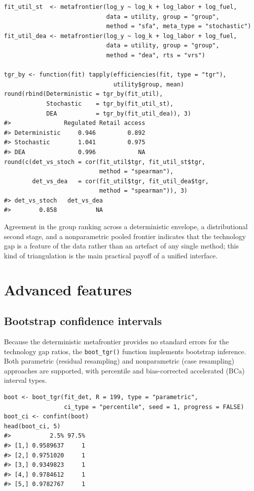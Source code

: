 \begin{verbatim}
fit_util_st  <- metafrontier(log_y ~ log_k + log_labor + log_fuel,
                             data = utility, group = "group",
                             method = "sfa", meta_type = "stochastic")
fit_util_dea <- metafrontier(log_y ~ log_k + log_labor + log_fuel,
                             data = utility, group = "group",
                             method = "dea", rts = "vrs")

tgr_by <- function(fit) tapply(efficiencies(fit, type = "tgr"),
                               utility$group, mean)
round(rbind(Deterministic = tgr_by(fit_util),
            Stochastic    = tgr_by(fit_util_st),
            DEA           = tgr_by(fit_util_dea)), 3)
#>               Regulated Retail access
#> Deterministic     0.946         0.892
#> Stochastic        1.041         0.975
#> DEA               0.996            NA
round(c(det_vs_stoch = cor(fit_util$tgr, fit_util_st$tgr,
                           method = "spearman"),
        det_vs_dea   = cor(fit_util$tgr, fit_util_dea$tgr,
                           method = "spearman")), 3)
#> det_vs_stoch   det_vs_dea 
#>        0.858           NA
\end{verbatim}

Agreement in the group ranking across a deterministic envelope, a
distributional second stage, and a nonparametric pooled frontier indicates
that the technology gap is a feature of the data rather than an artefact
of any single method; this kind of triangulation is the main practical
payoff of a unified interface.

\section{Advanced features}\label{sec:advanced-features}

\subsection{Bootstrap confidence intervals}\label{sec:bootstrap-ci}

Because the deterministic metafrontier provides no standard errors for the
technology gap ratios, the \texttt{boot\_tgr()} function implements bootstrap inference.
Both parametric (residual resampling) and nonparametric (case resampling)
approaches are supported, with percentile and bias-corrected accelerated (BCa)
interval types.

\begin{verbatim}
boot <- boot_tgr(fit_det, R = 199, type = "parametric",
                 ci_type = "percentile", seed = 1, progress = FALSE)
boot_ci <- confint(boot)
head(boot_ci, 5)
#>           2.5% 97.5%
#> [1,] 0.9589637     1
#> [2,] 0.9751020     1
#> [3,] 0.9349823     1
#> [4,] 0.9784612     1
#> [5,] 0.9782767     1
\end{verbatim}

